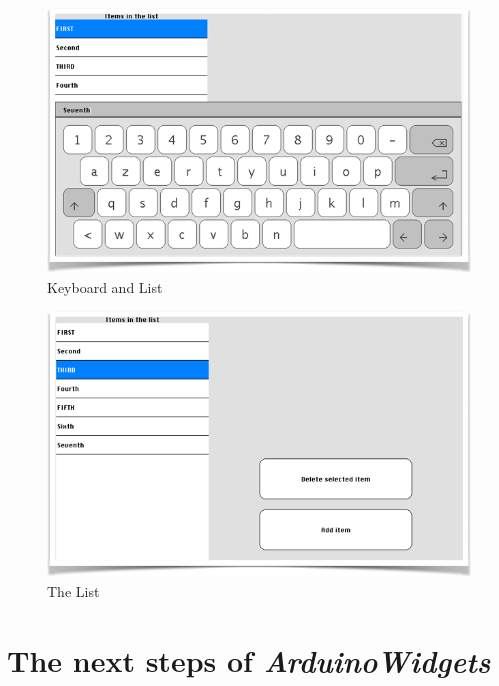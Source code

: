 \documentclass[a4paper,11pt]{extarticle}
\begin{document}
\begin{figure}[htbp]
   \centering
   \includegraphics[scale=0.55]{AWFig21.png} 
   \caption{Keyboard and List}
   \label{fig:21 }
\end{figure}

\begin{figure}[htbp]
   \centering
   \includegraphics[scale=0.55]{AWFig22.png} 
   \caption{The List}
   \label{fig:22 }
\end{figure}


\newpage
\section{The next steps of \emph{ArduinoWidgets}}

~\\

~\\

~\\
\end{document}
